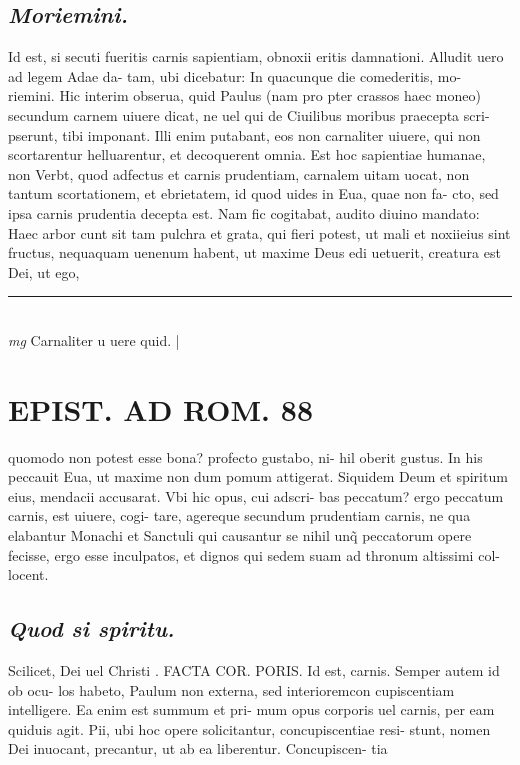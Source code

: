 \documentclass{article}
\begin{document}
\begin{pages}
\subsection*{\textit{Moriemini. }}\pstart Id est, si secuti fueritis carnis sapientiam, obnoxii eritis damnationi. Alludit uero ad legem Adae da- tam, ubi dicebatur: In quacunque die comederitis, mo- riemini. Hic interim obserua, quid Paulus (nam pro pter crassos haec moneo) secundum carnem uiuere dicat, ne uel qui de Ciuilibus moribus praecepta scri- pserunt, tibi imponant. Illi enim putabant, eos non carnaliter uiuere, qui non scortarentur helluarentur, et decoquerent omnia. Est hoc sapientiae humanae, non Verbt, quod adfectus et carnis prudentiam, carnalem uitam uocat, non tantum scortationem, et ebrietatem, id quod uides in Eua, quae non fa- cto, sed ipsa carnis prudentia decepta est. Nam fic cogitabat, audito diuino mandato: Haec arbor cunt sit tam pulchra et grata, qui fieri potest, ut mali et noxiieius sint fructus, nequaquam uenenum habent, ut maxime Deus edi uetuerit, creatura est Dei, ut ego,  \pend
\vspace{0.5cm}\noindent
\vspace{0.2cm}\rule{1cm}{0.2pt}\\ 
\hspace{0.2cm}\textit{mg}
\footnotesize Carnaliter u uere quid. 
\normalsize| 
\section*{EPIST. AD ROM.  88 }
\marginpar{[ p.]}\pstart quomodo non potest esse bona? profecto gustabo, ni- hil oberit gustus. In his peccauit Eua, ut maxime non dum pomum attigerat. Siquidem Deum et spiritum eius, mendacii accusarat. Vbi hic opus, cui adscri- bas peccatum? ergo peccatum carnis, est uiuere, cogi- tare, agereque secundum prudentiam carnis, ne qua elabantur Monachi et Sanctuli qui causantur se nihil unq̃ peccatorum opere fecisse, ergo esse inculpatos, et dignos qui sedem suam ad thronum altissimi col- locent.   \pend
{}
{}
\subsection*{\textit{Quod si spiritu. }}\pstart Scilicet, Dei uel Christi . FACTA COR.  PORIS. Id est, carnis. Semper autem id ob ocu- los habeto, Paulum non externa, sed interioremcon cupiscentiam intelligere. Ea enim est summum et pri- mum opus corporis uel carnis, per eam quiduis agit.  Pii, ubi hoc opere solicitantur, concupiscentiae resi- stunt, nomen Dei inuocant, precantur, ut ab ea liberentur.  Concupiscen- tia  \pend
{}
{}

\end{pages}
\end{document}
